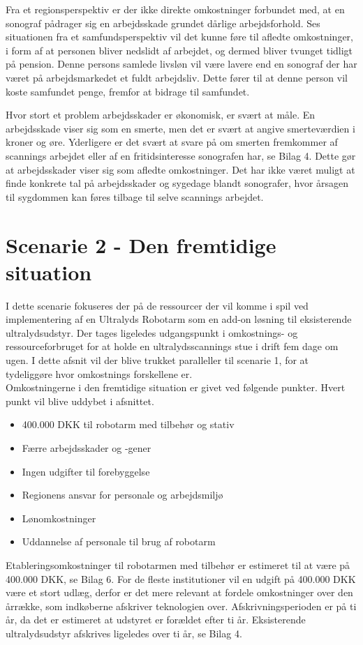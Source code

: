 Fra et regionsperspektiv er der ikke direkte omkostninger forbundet med, at en sonograf pådrager sig en arbejdsskade grundet dårlige arbejdsforhold. Ses situationen fra et samfundsperspektiv vil det kunne føre til afledte omkostninger, i form af at personen bliver nedslidt af arbejdet, og dermed bliver tvunget tidligt på pension. Denne persons samlede livsløn vil være lavere end en sonograf der har været på arbejdsmarkedet et fuldt arbejdsliv. Dette fører til at denne person vil koste samfundet penge, fremfor at bidrage til samfundet. 

Hvor stort et problem arbejdsskader er økonomisk, er svært at måle. En arbejdsskade viser sig som en smerte, men det er svært at angive smerteværdien i kroner og øre. Yderligere er det svært
at svare på om smerten fremkommer af scannings arbejdet eller af en fritidsinteresse sonografen har, se Bilag 4. Dette gør at arbejdsskader viser sig som afledte omkostninger. Det har ikke været muligt at finde konkrete tal på arbejdsskader og sygedage blandt sonografer, hvor årsagen til sygdommen kan føres tilbage til selve scannings arbejdet.  


\section{Scenarie 2 - Den fremtidige situation} \label{fremtidige}
I dette scenarie fokuseres der på de ressourcer der vil komme i spil ved implementering af en Ultralyds Robotarm som en add-on løsning til eksisterende ultralydsudstyr. Der tages ligeledes udgangspunkt i omkostnings- og ressourceforbruget for at holde en ultralydsscannings stue i drift fem dage om ugen. I dette afsnit vil der blive trukket paralleller til scenarie 1, for at tydeliggøre hvor omkostnings forskellene er. \\
Omkostningerne i den fremtidige situation er givet ved følgende punkter. Hvert punkt vil blive uddybet i afsnittet.
\begin{itemize}
\item 400.000 DKK til robotarm med tilbehør og stativ
\item Færre arbejdsskader og -gener
\item Ingen udgifter til forebyggelse
\item Regionens ansvar for personale og arbejdsmiljø
\item Lønomkostninger
\item Uddannelse af personale til brug af robotarm
\end{itemize}
Etableringsomkostninger til robotarmen med tilbehør er estimeret til at være på 400.000 DKK, se Bilag 6.
For de fleste institutioner vil en udgift på 400.000 DKK være et stort udlæg, derfor er det mere relevant at fordele omkostninger over den årrække, som indkøberne afskriver teknologien over. Afskrivningsperioden er på ti år, da det er estimeret at udstyret er forældet efter ti år. Eksisterende ultralydsudstyr afskrives ligeledes over ti år, se Bilag 4.

